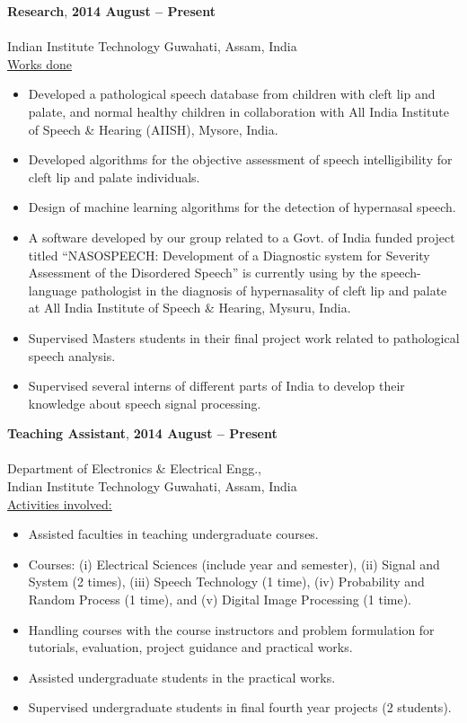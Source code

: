 \documentclass[10pt]{article}
\begin{document}
\textbf{Research},  \hfill \textbf{2014 August -- Present}\\ \\
         Indian Institute Technology Guwahati, Assam, India  \\ 
\underline{Works done}
\begin{itemize}
\item Developed a pathological speech database from children with cleft lip and palate, and normal healthy children in collaboration with All India Institute of Speech \& Hearing (AIISH), Mysore, India.
\item Developed algorithms for the objective assessment of speech intelligibility for cleft lip and palate individuals.
\item Design of machine learning algorithms for the detection of hypernasal speech.
\item A software developed by our group related to a Govt. of India funded project titled “NASOSPEECH: Development of a Diagnostic system for Severity Assessment of the Disordered Speech” is currently using by the speech-language pathologist in the diagnosis of hypernasality of cleft lip and palate at All India Institute of Speech \& Hearing, Mysuru, India.
\item Supervised Masters students in their final project work related to pathological speech analysis.
\item Supervised several interns of different parts of India to develop their knowledge about speech signal processing. 
\end{itemize}

\textbf{Teaching Assistant},  \hfill \textbf{2014 August -- Present}\\ \\
         Department of Electronics \& Electrical Engg., \\
         Indian Institute Technology Guwahati, Assam, India  \\ 
\underline{Activities involved:}
\begin{itemize}
\item Assisted faculties in teaching undergraduate courses.
\item Courses: (i) Electrical Sciences (include year and semester),  (ii) Signal and System (2 times), (iii) Speech Technology (1 time), (iv) Probability and Random Process (1 time), and (v) Digital Image Processing (1 time).
\item Handling courses with the course instructors and problem formulation for tutorials, evaluation, project guidance and practical works.
\item Assisted undergraduate students in the practical works.
\item Supervised undergraduate students in final fourth year projects (2 students).\\
\end{itemize}
\end{document}
